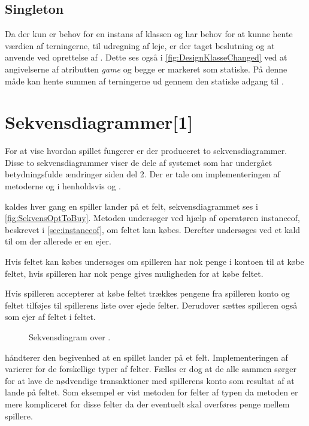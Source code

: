 \subsection{Singleton}\label{sec:desSingleon}
Da der kun er behov for en instans af klassen  og  har behov for at kunne hente værdien af terningerne, til udregning af leje, er der taget beslutning og at anvende  ved oprettelse af . Dette ses også i \vref{fig:DesignKlasseChanged} ved at angivelserne af atributten \textit{game} og  begge er markeret som statiske. På denne måde kan  hente summen af terningerne ud gennem den statiske adgang til . 

\section{Sekvensdiagrammer[1]}
For at vise hvordan spillet fungerer er der produceret to sekvensdiagrammer. Disse to sekvensdiagrammer viser de dele af systemet som har undergået betydningsfulde ændringer siden del 2. Der er tale om implementeringen af metoderne  og  i henholdsvis  og .

 kaldes hver gang en spiller lander på et felt, sekvensdiagrammet ses i \vref{fig:SekvensOptToBuy}. Metoden undersøger ved hjælp af operatøren instanceof, beskrevet i \vref{sec:instanceof}, om feltet kan købes. Derefter undersøges ved et kald til  om der allerede er en ejer.

Hvis feltet kan købes undersøges om spilleren har nok penge i kontoen til at købe feltet, hvis spilleren har nok penge gives muligheden for at købe  feltet.

Hvis spilleren accepterer at købe feltet trækkes pengene fra spilleren konto og feltet tilføjes til spillerens liste over ejede felter. Derudover sættes spilleren også som ejer af feltet i feltet.

\begin{figure}
\caption{Sekvensdiagram over .}
\label{fig:SekvensOptToBuy}
\centering

\end{figure}

 håndterer den begivenhed at en spillet lander på et felt. Implementeringen af  varierer for de forskellige typer af felter. Fælles er dog at de alle sammen sørger for at lave de nødvendige transaktioner med spillerens konto som resultat af at lande på feltet. Som eksempel er vist metoden for felter af typen  da metoden er mere kompliceret for disse felter da der eventuelt skal overføres penge mellem spillere.

